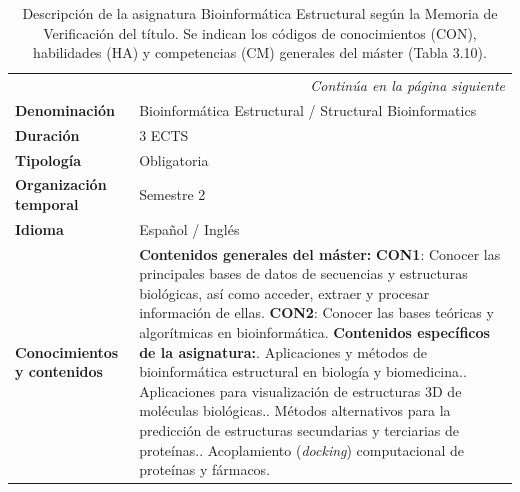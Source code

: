 \documentclass[
  11pt,
  a4paper,
  twoside]{scrreprt}
\begin{document}
\begin{longtable}{p{} p{}}

\caption{\label{tbl-strbio}Descripción de la asignatura Bioinformática Estructural según la Memoria de Verificación del título. Se indican los códigos de conocimientos (CON), habilidades (HA) y competencias (CM) generales del máster (Tabla 3.10).}

\tabularnewline

 \\
\hline
\endfirsthead

\endhead

\hline
\multicolumn{2}{r}{\footnotesize\itshape Continúa en la página siguiente} \\
\endfoot

\hline
\endlastfoot


\textbf{Denominación} & Bioinformática Estructural / Structural Bioinformatics \\
\hline

\textbf{Duración} & 3 ECTS \\
\hline

\textbf{Tipología} & Obligatoria \\
\hline

\textbf{Organización temporal} & Semestre 2 \\
\hline

\textbf{Idioma} & Español / Inglés \\
\hline

\textbf{Conocimientos y contenidos} &
\textbf{Contenidos generales del máster:}\newline
\textbf{CON1}: Conocer las principales bases de datos de secuencias y estructuras biológicas, así como acceder, extraer y procesar información de ellas.\newline
\textbf{CON2}: Conocer las bases teóricas y algorítmicas en bioinformática.\newline\newline
\textbf{Contenidos específicos de la asignatura:}\newline
1. Aplicaciones y métodos de bioinformática estructural en biología y biomedicina.\newline
2. Aplicaciones para visualización de estructuras 3D de moléculas biológicas.\newline
3. Métodos alternativos para la predicción de estructuras secundarias y terciarias de proteínas.\newline
4. Acoplamiento (\textit{docking}) computacional de proteínas y fármacos. \\
\hline


\end{longtable}
\end{document}
